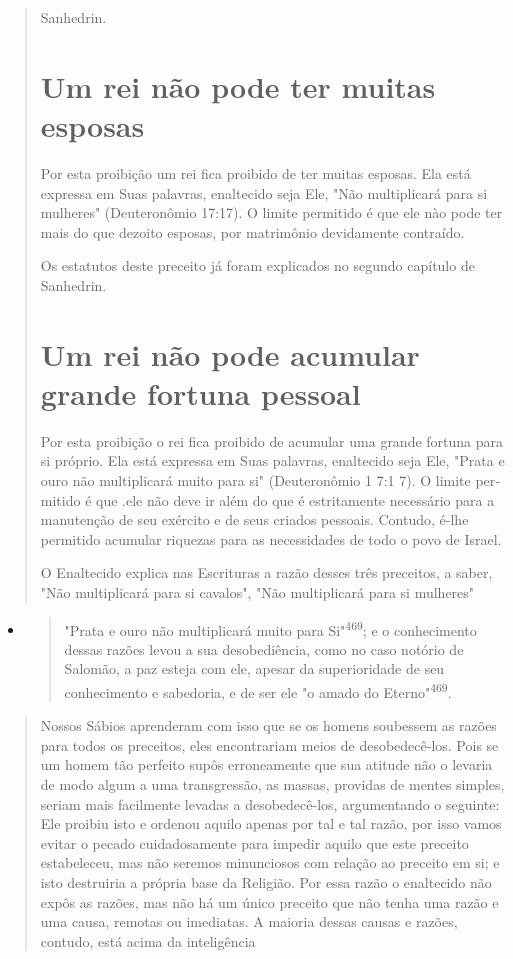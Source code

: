 \begin{quote}
Sanhedrin.

\section{Um rei não pode ter muitas esposas}

Por esta proibição um rei fica proibido de ter muitas esposas. Ela es­tá
expressa em Suas palavras, enaltecido seja Ele, "Não multiplicará para
si mu­lheres" (Deuteronômio 17:17). O limite permitido é que ele nào
pode ter mais do que dezoito esposas, por matrimônio devidamente
contraído.

Os estatutos deste preceito já foram explicados no segundo capítulo de
Sanhedrin.

\section{Um rei não pode acumular grande fortuna pessoal}

Por esta proibição o rei fica proibido de acumular uma grande fortu­na
para si próprio. Ela está expressa em Suas palavras, enaltecido seja
Ele, "Pra­ta e ouro não multiplicará muito para si" (Deuteronômio 1 7:1
7). O limite per­mitido é que .ele não deve ir além do
que é estritamente necessário para a ma­nutenção de seu exército e de
seus criados pessoais. Contudo, é-lhe permitido acumular riquezas para
as necessidades de todo o povo de Israel.

O Enaltecido explica nas Escrituras a razão desses três preceitos, a
saber, "Não multiplicará para si cavalos", "Não multiplicará para si
mulheres"
\end{quote}

\begin{itemize}
\item
 \begin{quote}
 "Prata e ouro não multiplicará muito para Si"\textsuperscript{469}; e
 o conhecimento dessas razões levou a sua desobediência, como no caso
 notório de Salomão, a paz es­teja com ele, apesar da superioridade de
 seu conhecimento e sabedoria, e de ser ele "o amado do
 Eterno"\textsuperscript{469}.
 \end{quote}
\end{itemize}

\begin{quote}
Nossos Sábios aprenderam com isso que se os homens soubessem as razões
para todos os preceitos, eles encontrariam meios de desobedecê-los. Pois
se um homem tão perfeito supôs erroneamente que sua atitude não o
leva­ria de modo algum a uma transgressão, as massas, providas de mentes
simples, seriam mais facilmente levadas a desobedecê-los, argumentando o
seguinte: Ele proibiu isto e ordenou aquilo apenas por tal e tal razão,
por isso vamos evitar o pecado cuidadosamente para impedir aquilo que
este preceito estabeleceu, mas não seremos minunciosos com relação ao
preceito em si; e isto destruiria a própria base da Religião. Por essa
razão o enaltecido não expôs as razões, mas não há um único preceito que
não tenha uma razão e uma causa, remotas ou imediatas. A maioria dessas
causas e razões, contudo, está acima da inteligência
\end{quote}

